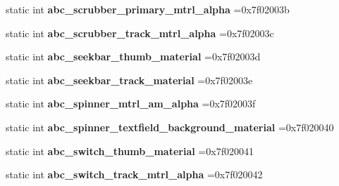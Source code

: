 \begin{DoxyCompactItemize}
static int {\bfseries abc\+\_\+scrubber\+\_\+primary\+\_\+mtrl\+\_\+alpha} =0x7f02003b
\item 
\mbox{\label{classandroid_1_1support_1_1v7_1_1cardview_1_1R_1_1drawable_a0bbf928495f25c666258649d955df13b}} 
static int {\bfseries abc\+\_\+scrubber\+\_\+track\+\_\+mtrl\+\_\+alpha} =0x7f02003c
\item 
\mbox{\label{classandroid_1_1support_1_1v7_1_1cardview_1_1R_1_1drawable_ab88a955bdef97d982b920eabe47df1df}} 
static int {\bfseries abc\+\_\+seekbar\+\_\+thumb\+\_\+material} =0x7f02003d
\item 
\mbox{\label{classandroid_1_1support_1_1v7_1_1cardview_1_1R_1_1drawable_a5884c258048a3ddbb61777a291aabd88}} 
static int {\bfseries abc\+\_\+seekbar\+\_\+track\+\_\+material} =0x7f02003e
\item 
\mbox{\label{classandroid_1_1support_1_1v7_1_1cardview_1_1R_1_1drawable_af2705611dbd613d8c62645c8816e6db9}} 
static int {\bfseries abc\+\_\+spinner\+\_\+mtrl\+\_\+am\+\_\+alpha} =0x7f02003f
\item 
\mbox{\label{classandroid_1_1support_1_1v7_1_1cardview_1_1R_1_1drawable_a34927a6ece62c002781c6186d7978be6}} 
static int {\bfseries abc\+\_\+spinner\+\_\+textfield\+\_\+background\+\_\+material} =0x7f020040
\item 
\mbox{\label{classandroid_1_1support_1_1v7_1_1cardview_1_1R_1_1drawable_ad3dcb2d9bd97883c5ece4614382ee3e8}} 
static int {\bfseries abc\+\_\+switch\+\_\+thumb\+\_\+material} =0x7f020041
\item 
\mbox{\label{classandroid_1_1support_1_1v7_1_1cardview_1_1R_1_1drawable_afc0cd7fa5c16db61b11d0afbdfbc301d}} 
static int {\bfseries abc\+\_\+switch\+\_\+track\+\_\+mtrl\+\_\+alpha} =0x7f020042
\item 
\mbox{\label{classandroid_1_1support_1_1v7_1_1cardview_1_1R_1_1drawable_aab0428d35fdeaab28751c71f914b8a68}} 

\end{DoxyCompactItemize}
